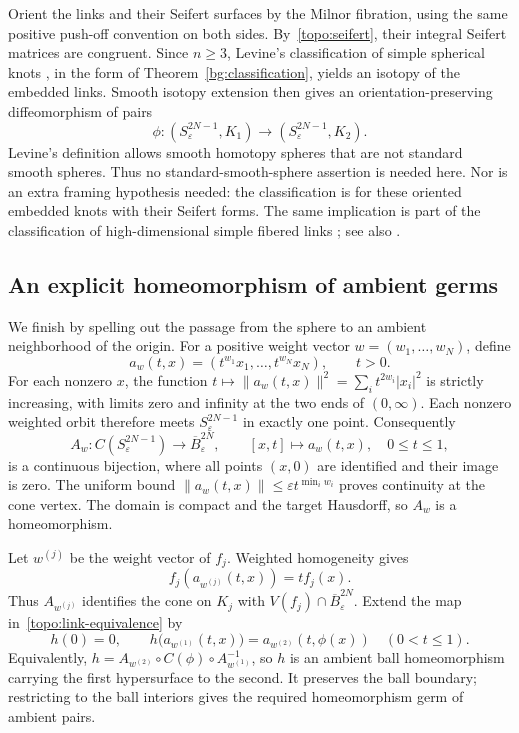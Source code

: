 Orient the links and their Seifert surfaces by the Milnor fibration,
using the same positive push-off convention on both sides.
By~\eqref{topo:seifert}, their integral Seifert matrices are congruent.
Since $n\geq3$, Levine's classification of simple spherical knots
\cite[Theorem~3]{Levine1970}, in the form of
Theorem~\ref{bg:classification}, yields an isotopy of the embedded links. Smooth isotopy extension
then gives an orientation-preserving diffeomorphism of pairs
\begin{equation}
\label{topo:link-equivalence}
 \phi:(S^{2N-1}_\varepsilon,K_1)
       \longrightarrow(S^{2N-1}_\varepsilon,K_2).
\end{equation}
Levine's definition allows smooth homotopy spheres that are not
standard smooth spheres.  Thus no standard-smooth-sphere assertion
is needed here.  Nor is an extra framing hypothesis needed: the
classification is for these oriented embedded knots with their
Seifert forms.  The same implication is part of the classification
of high-dimensional simple fibered links
\cite{Durfee1974,Saeki1999}; see also \cite{Neumann2017}.

\subsection{An explicit homeomorphism of ambient germs}

We finish by spelling out the passage from the sphere to an ambient
neighborhood of the origin.  For a positive weight vector
$w=(w_1,\ldots,w_N)$, define
\[
 a_w(t,x)=(t^{w_1}x_1,\ldots,t^{w_N}x_N),\qquad t>0.
\]
For each nonzero $x$, the function
$t\mapsto\|a_w(t,x)\|^2=\sum_i t^{2w_i}|x_i|^2$
is strictly increasing, with limits zero and infinity at the two
ends of $(0,\infty)$.  Each nonzero weighted orbit therefore meets
$S^{2N-1}_\varepsilon$ in exactly one point.  Consequently
\begin{equation}
\label{topo:weighted-cone}
 A_w:C(S^{2N-1}_\varepsilon)\longrightarrow\overline B^{2N}_\varepsilon,
 \qquad [x,t]\longmapsto a_w(t,x),
 \quad 0\leq t\leq1,
\end{equation}
is a continuous bijection, where all points $(x,0)$ are identified
and their image is zero.  The uniform bound
$\|a_w(t,x)\|\leq\varepsilon t^{\min_i w_i}$ proves continuity
at the cone vertex.  The domain is compact and the target Hausdorff, so
$A_w$ is a homeomorphism.

Let $w^{(j)}$ be the weight vector of $f_j$.  Weighted homogeneity
gives
\[
 f_j(a_{w^{(j)}}(t,x))=t f_j(x).
\]
Thus $A_{w^{(j)}}$ identifies the cone on $K_j$ with
$V(f_j)\cap\overline B^{2N}_\varepsilon$.  Extend the map
in~\eqref{topo:link-equivalence} by
\begin{equation}
\label{topo:ambient-map}
 h(0)=0,
 \qquad
 h\bigl(a_{w^{(1)}}(t,x)\bigr)
      =a_{w^{(2)}}(t,\phi(x))
 \quad(0<t\leq1).
\end{equation}
Equivalently, $h=A_{w^{(2)}}\circ C(\phi)\circ A_{w^{(1)}}^{-1}$,
so $h$ is an ambient ball homeomorphism carrying the first
hypersurface to the second.  It preserves the ball boundary;
restricting to the ball interiors gives the required homeomorphism
germ of ambient pairs.

